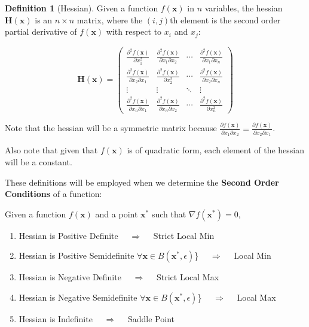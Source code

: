 \documentclass[
]{book}
\providecommand{\tightlist}{%
  \setlength{\itemsep}{0pt}\setlength{\parskip}{0pt}}
\theoremstyle{definition}
\newtheorem{definition}{Definition}[chapter]
\theoremstyle{definition}
\theoremstyle{definition}
\theoremstyle{definition}
\theoremstyle{remark}
\begin{document}
\begin{definition}[Hessian]
\protect\hypertarget{def:unnamed-chunk-243}{}{\label{def:unnamed-chunk-243} {} }
Given a function \(f(\mathbf{x})\) in \(n\) variables, the hessian \(\mathbf{H(x)}\) is
an \(n\times n\) matrix, where the \((i,j)\)th element is the second order
partial derivative of \(f(\mathbf{x})\) with respect to \(x_i\) and \(x_j\):

\[\mathbf{H(x)}=\begin{pmatrix}
\frac{\partial^2 f(\mathbf{x})}{\partial x_1^2}&\frac{\partial^2f(\mathbf{x})}{\partial x_1 \partial x_2}&
\cdots & \frac{\partial^2 f(\mathbf{x})}{\partial x_1 \partial x_n}\\[9pt]
\frac{\partial^2 f(\mathbf{x})}{\partial x_2 \partial x_1}&\frac{\partial^2f(\mathbf{x})}{\partial x_2^2}&
\cdots & \frac{\partial^2 f(\mathbf{x})}{\partial x_2 \partial x_n}\\
\vdots & \vdots & \ddots & \vdots \\[3pt]
\frac{\partial^2 f(\mathbf{x})}{\partial x_n \partial x_1}&\frac{\partial^2f(\mathbf{x})}{\partial x_n \partial x_2}&
\cdots & \frac{\partial^2 f(\mathbf{x})}{\partial x_n^2}\end{pmatrix}\]
\end{definition}

Note that the hessian will be a symmetric matrix because \(\frac{\partial f(\mathbf{x})}{\partial x_1\partial x_2} = \frac{\partial f(\mathbf{x})}{\partial x_2\partial x_1}\).

Also note that given that \(f(\mathbf{x})\) is of quadratic form, each element of the hessian will be a constant.

These definitions will be employed when we determine the \textbf{Second Order Conditions} of a function:

Given a function \(f(\mathbf{x})\) and a point \(\mathbf{x}^*\) such that \(\nabla f(\mathbf{x}^*)=0\),

\begin{enumerate}
\def\labelenumi{\arabic{enumi}.}
\tightlist
\item
  Hessian is Positive Definite \(\quad \Longrightarrow \quad\) Strict Local Min
\item
  Hessian is Positive Semidefinite \(\forall \mathbf{x}\in B(\mathbf{x}^*,\epsilon)\)\} \(\quad \Longrightarrow \quad\) Local Min
\item
  Hessian is Negative Definite \(\quad \Longrightarrow \quad\) Strict Local Max
\item
  Hessian is Negative Semidefinite \(\forall \mathbf{x}\in B(\mathbf{x}^*,\epsilon)\)\} \(\quad \Longrightarrow \quad\) Local Max
\item
  Hessian is Indefinite \(\quad \Longrightarrow \quad\) Saddle Point
\end{enumerate}
\end{document}
